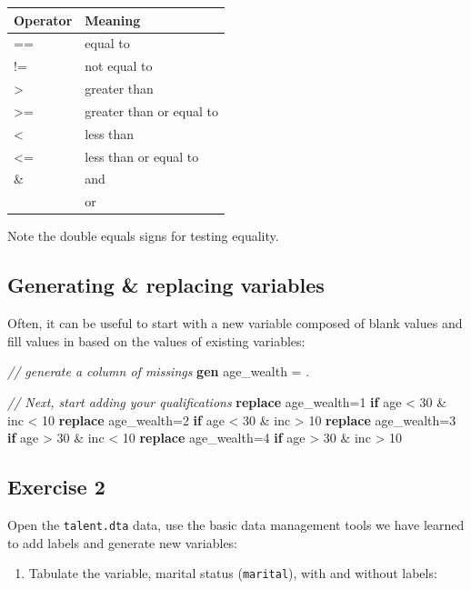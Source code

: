 \documentclass[
]{book}
\newenvironment{Shaded}{\begin{snugshade}}{\end{snugshade}}
\newcommand{\CommentTok}[1]{\textcolor[rgb]{0.56,0.35,0.01}{\textit{#1}}}
\newcommand{\KeywordTok}[1]{\textcolor[rgb]{0.13,0.29,0.53}{\textbf{#1}}}
\newcommand{\NormalTok}[1]{#1}
\providecommand{\tightlist}{%
  \setlength{\itemsep}{0pt}\setlength{\parskip}{0pt}}
\begin{document}
\begin{longtable}[]{@{}ll@{}}
\toprule
Operator & Meaning\tabularnewline
\midrule
\endhead
== & equal to\tabularnewline
!= & not equal to\tabularnewline
\textgreater{} & greater than\tabularnewline
\textgreater= & greater than or equal to\tabularnewline
\textless{} & less than\tabularnewline
\textless= & less than or equal to\tabularnewline
\& & and\tabularnewline
\textbar{} & or\tabularnewline
\bottomrule
\end{longtable}

Note the double equals signs for testing equality.

\hypertarget{generating-replacing-variables}{%
\subsection{Generating \& replacing variables}\label{generating-replacing-variables}}

Often, it can be useful to start with a new variable composed of blank values and fill values in based on the values of existing variables:

\begin{Shaded}
\begin{Highlighting}[]
\CommentTok{// generate a column of missings}
\KeywordTok{gen}\NormalTok{ age\_wealth = .}

\CommentTok{// Next, start adding your qualifications}
\KeywordTok{replace}\NormalTok{ age\_wealth=1 }\KeywordTok{if}\NormalTok{ age \textless{} 30 \& inc \textless{} 10}
\KeywordTok{replace}\NormalTok{ age\_wealth=2 }\KeywordTok{if}\NormalTok{ age \textless{} 30 \& inc \textgreater{} 10}
\KeywordTok{replace}\NormalTok{ age\_wealth=3 }\KeywordTok{if}\NormalTok{ age \textgreater{} 30 \& inc \textless{} 10}
\KeywordTok{replace}\NormalTok{ age\_wealth=4 }\KeywordTok{if}\NormalTok{ age \textgreater{} 30 \& inc \textgreater{} 10}
\end{Highlighting}
\end{Shaded}

\hypertarget{exercise-2-4}{%
\subsection{Exercise 2}\label{exercise-2-4}}

Open the \texttt{talent.dta} data, use the basic data management tools we have learned to add labels and generate new variables:

\begin{enumerate}
\def\labelenumi{\arabic{enumi}.}
\tightlist
\item
  Tabulate the variable, marital status (\texttt{marital}), with and without labels:
\end{enumerate}
\end{document}
